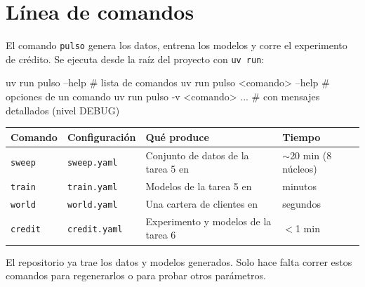 \chapter{Línea de comandos}
\label{cap:cli}

El comando \texttt{pulso} genera los datos, entrena los modelos y corre el experimento de
crédito. Se ejecuta desde la raíz del proyecto con \texttt{uv run}:

\begin{terminal}
uv run pulso --help              # lista de comandos
uv run pulso <comando> --help    # opciones de un comando
uv run pulso -v <comando> ...    # con mensajes detallados (nivel DEBUG)
\end{terminal}

\begin{center}
\begin{tabular}{llL{0.4\textwidth}l}
\toprule
\textbf{Comando} & \textbf{Configuración} & \textbf{Qué produce} & \textbf{Tiempo} \\
\midrule
\texttt{sweep} & \texttt{sweep.yaml} & Conjunto de datos de la tarea 5 en  &
$\sim$20 min (8 núcleos) \\
\texttt{train} & \texttt{train.yaml} & Modelos de la tarea 5 en  & minutos \\
\texttt{world} & \texttt{world.yaml} & Una cartera de clientes en
 & segundos \\
\texttt{credit} & \texttt{credit.yaml} & Experimento y modelos de la tarea 6 &
$<$1 min \\
\bottomrule
\end{tabular}
\end{center}

El repositorio ya trae los datos y modelos generados. Solo hace falta correr estos
comandos para regenerarlos o para probar otros parámetros.

